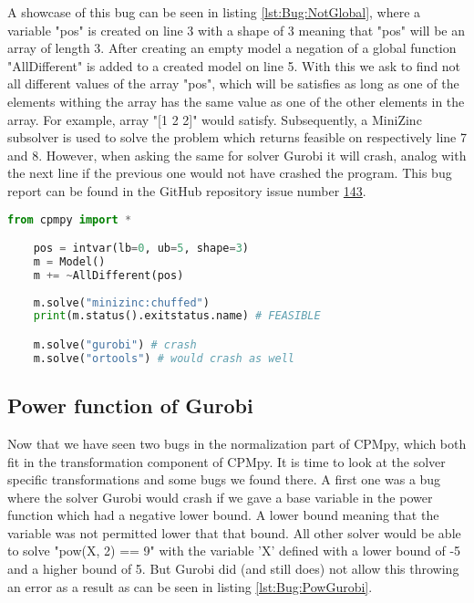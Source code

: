 A showcase of this bug can be seen in listing \ref{lst:Bug:NotGlobal}, where a variable "pos" is created on line 3 with a shape of 3 meaning that "pos" will be an array of length 3. After creating an empty model a negation of a global function "AllDifferent" is added to a created model on line 5. With this we ask to find not all different values of the array "pos", which will be satisfies as long as one of the elements withing the array has the same value as one of the other elements in the array. For example, array "[1 2 2]" would satisfy. Subsequently, a MiniZinc subsolver is used to solve the problem which returns feasible on respectively line 7 and 8. However, when asking the same for solver Gurobi it will crash, analog with the next line if the previous one would not have crashed the program. This bug report can be found in the GitHub repository issue number  \href{https://github.com/CPMpy/cpmpy/issues/143}{143}.

\label{lst:Bug:NotGlobal}
\begin{lstlisting}[language=python, caption={The "negation of global functions"-bug.}]
	from cpmpy import *

	pos = intvar(lb=0, ub=5, shape=3)
	m = Model()
	m += ~AllDifferent(pos)
	
	m.solve("minizinc:chuffed")
	print(m.status().exitstatus.name) # FEASIBLE

	m.solve("gurobi") # crash
	m.solve("ortools") # would crash as well
\end{lstlisting}

\subsection{Power function of Gurobi}
\label{res:bug:Power}
Now that we have seen two bugs in the normalization part of CPMpy, which both fit in the transformation component of CPMpy. It is time to look at the solver specific transformations and some bugs we found there. A first one was a bug where the solver Gurobi would crash if we gave a base variable in the power function which had a negative lower bound. A lower bound meaning that the variable was not permitted lower that that bound. All other solver would be able to solve "pow(X, 2) == 9" with the variable 'X' defined with a lower bound of -5 and a higher bound of 5. But Gurobi did (and still does) not allow this throwing an error as a result as can be seen in listing \ref{lst:Bug:PowGurobi}.


